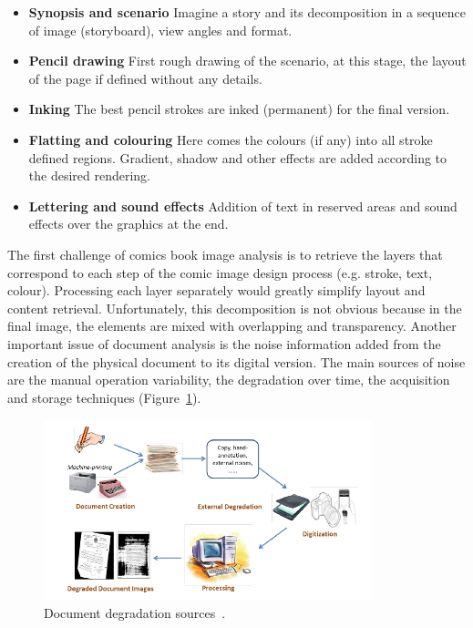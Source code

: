 \begin{itemize}
  \item \textbf{Synopsis and scenario} Imagine a story and its decomposition in a sequence of image (storyboard), view angles and format. 
  \item \textbf{Pencil drawing} First rough drawing of the scenario, at this stage, the layout of the page if defined without any details.
  \item \textbf{Inking} The best pencil strokes are inked (permanent) for the final version.
  \item \textbf{Flatting and colouring} Here comes the colours (if any) into all stroke defined regions. Gradient, shadow and other effects are added according to the desired rendering.
  \item \textbf{Lettering and sound effects} Addition of text in reserved areas and sound effects over the graphics at the end.
\end{itemize}

The first challenge of comics book image analysis is to retrieve the layers that correspond to each step of the comic image design process (e.g. stroke, text, colour).
Processing each layer separately would greatly simplify layout and content retrieval.
Unfortunately, this decomposition is not obvious because in the final image, the elements are mixed with overlapping and transparency.
Another important issue of document analysis is the noise information added from the creation of the physical document to its digital version.
The main sources of noise are the manual operation variability, the degradation over time, the acquisition and storage techniques (Figure~\ref{fig:sota:document_degradation}).


    \begin{figure}[!ht]%
      \centering
      \includegraphics[width=0.85\textwidth]{document_degradation.png}
    \caption[Document degradation sources]{Document degradation sources~\cite{Peng2013Document}.}
    \label{fig:sota:document_degradation}
    \end{figure}


